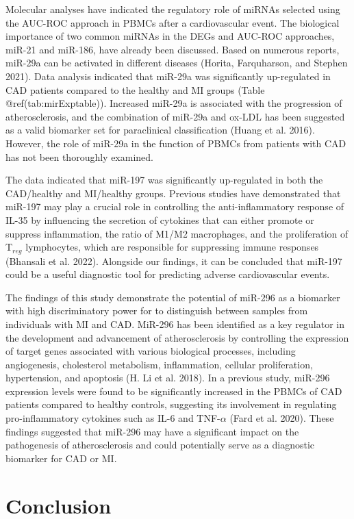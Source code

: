 \documentclass[
]{article}
\begin{document}
Molecular analyses have indicated the regulatory role of miRNAs selected
using the AUC-ROC approach in PBMCs after a cardiovascular event. The
biological importance of two common miRNAs in the DEGs and AUC-ROC
approaches, miR-21 and miR-186, have already been discussed. Based on
numerous reports, miR-29a can be activated in different diseases
(Horita, Farquharson, and Stephen 2021). Data analysis indicated that
miR-29a was significantly up-regulated in CAD patients compared to the
healthy and MI groups (Table @ref(tab:mirExptable)). Increased miR-29a
is associated with the progression of atherosclerosis, and the
combination of miR-29a and ox-LDL has been suggested as a valid
biomarker set for paraclinical classification (Huang et al. 2016).
However, the role of miR-29a in the function of PBMCs from patients with
CAD has not been thoroughly examined.

The data indicated that miR-197 was significantly up-regulated in both
the CAD/healthy and MI/healthy groups. Previous studies have
demonstrated that miR-197 may play a crucial role in controlling the
anti-inflammatory response of IL-35 by influencing the secretion of
cytokines that can either promote or suppress inflammation, the ratio of
M1/M2 macrophages, and the proliferation of T\(_{reg}\) lymphocytes,
which are responsible for suppressing immune responses (Bhansali et al.
2022). Alongside our findings, it can be concluded that miR-197 could be
a useful diagnostic tool for predicting adverse cardiovascular events.

The findings of this study demonstrate the potential of miR-296 as a
biomarker with high discriminatory power for to distinguish between
samples from individuals with MI and CAD. MiR-296 has been identified as
a key regulator in the development and advancement of atherosclerosis by
controlling the expression of target genes associated with various
biological processes, including angiogenesis, cholesterol metabolism,
inflammation, cellular proliferation, hypertension, and apoptosis (H. Li
et al. 2018). In a previous study, miR-296 expression levels were found
to be significantly increased in the PBMCs of CAD patients compared to
healthy controls, suggesting its involvement in regulating
pro-inflammatory cytokines such as IL-6 and TNF-\(\alpha\) (Fard et al.
2020). These findings suggested that miR-296 may have a significant
impact on the pathogenesis of atherosclerosis and could potentially
serve as a diagnostic biomarker for CAD or MI.

\hypertarget{conclusion}{%
\section{Conclusion}\label{conclusion}}
\end{document}
